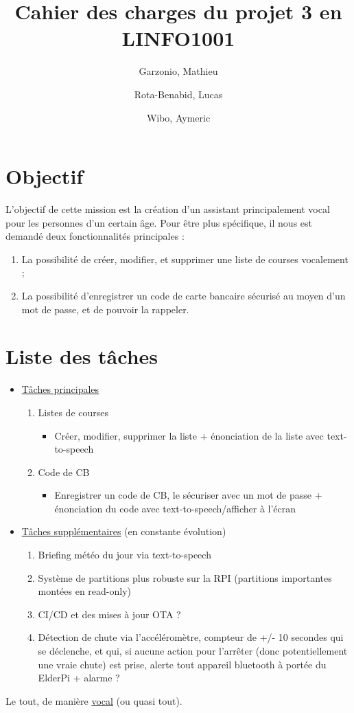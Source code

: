 \documentclass{article}
\title{Cahier des charges du projet 3 en LINFO1001}
\author{
	Garzonio, Mathieu
	\and
	Rota-Benabid, Lucas
	\and
	Wibo, Aymeric
}
\begin{document}
\maketitle

\section{Objectif}

L'objectif de cette mission est la création d'un assistant principalement vocal pour les personnes d'un certain âge. Pour être plus spécifique, il nous est demandé deux fonctionnalités principales :

\begin{enumerate}

	\item{La possibilité de créer, modifier, et supprimer une liste de courses vocalement ;}
	\item{La possibilité d'enregistrer un code de carte bancaire sécurisé au moyen d'un mot de passe, et de pouvoir la rappeler.}

\end{enumerate}

\section{Liste des tâches}

\begin{itemize}
    \item {\underline{Tâches principales}}
    \begin{enumerate}
        \item {Listes de courses}
        \begin{itemize}
            \item {Créer, modifier, supprimer la liste + énonciation de la liste avec text-to-speech}
        \end{itemize}
        \item {Code de CB}
        \begin{itemize}
            \item {Enregistrer un code de CB, le sécuriser avec un mot de passe + énonciation du code avec text-to-speech/afficher à l'écran}
        \end{itemize}
    \end{enumerate}
    \item {\underline{Tâches supplémentaires} (en constante évolution)}
    \begin{enumerate}
        \item Briefing météo du jour via text-to-speech
        \item {Système de partitions plus robuste sur la RPI (partitions importantes montées en read-only)}
        \item {CI/CD et des mises à jour OTA ?}
        \item {Détection de chute via l'accéléromètre, compteur de +/- 10 secondes qui se déclenche, et qui, si aucune action pour l'arrêter (donc potentiellement une vraie chute) est prise, alerte tout appareil bluetooth à portée du ElderPi + alarme ? }
    \end{enumerate}
\end{itemize}
Le tout, de manière \underline{vocal} (ou quasi tout).
\end{document}
